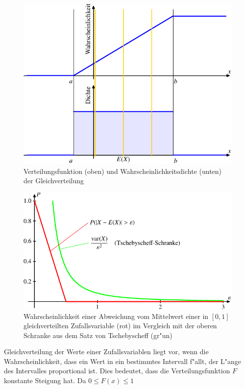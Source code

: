 \begin{figure}
\begin{center}
\includegraphics[width=0.8\hsize]{images/verteilungsfunktion-7}
\end{center}
\caption{Verteilungsfunktion (oben) und Wahrscheinlichkeitsdichte (unten)
der Gleichverteilung\label{bild-gleichverteilung}}
\end{figure}
\begin{figure}
\begin{center}
\includegraphics{images/gl-1.pdf}
\end{center}
\caption{Wahrscheinlichkeit einer Abweichung vom Mittelwert einer
in $[0,1]$ gleichverteilten Zufallsvariable (rot) im Vergleich mit
der oberen Schranke aus dem Satz von Tschebyscheff (gr"un)
\label{bild-gleichverteilung}}
\end{figure}
Gleichverteilung der Werte einer Zufallsvariablen liegt vor, wenn
die Wahrscheinlichkeit, dass ein Wert in ein bestimmtes Intervall
f"allt, der L"ange des Intervalles proportional ist. Dies bedeutet,
dass die Verteilungsfunktion $F$ konstante Steigung hat. Da $0\le F(x)\le 1$
